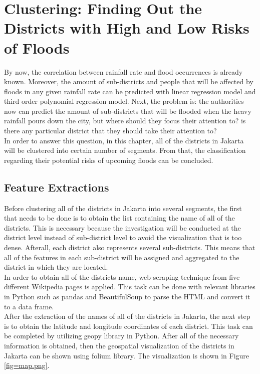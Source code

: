 \chapter{Clustering: Finding Out the Districts with High and Low Risks of Floods}

By now, the correlation between rainfall rate and flood occurrences is already known. Moreover, the amount of sub-districts and people that will be affected by floods in any given rainfall rate can be predicted with linear regression model and third order polynomial regression model. Next, the problem is: the authorities now can predict the amount of sub-districts that will be flooded when the heavy rainfall pours down the city, but where should they focus their attention to? is there any particular district that they should take their attention to?\\

\noindent
In order to answer this question, in this chapter, all of the districts in Jakarta will be clustered into certain number of segments. From that, the classification regarding their potential risks of upcoming floods can be concluded.\\

\section{Feature Extractions}
Before clustering all of the districts in Jakarta into several segments, the first that needs to be done is to obtain the list containing the name of all of the districts. This is necessary because the investigation will be conducted at the district level instead of sub-district level to avoid the visualization that is too dense. Afterall, each district also represents several sub-districts. This means that all of the features in each sub-district will be assigned and aggregated to the district in which they are located.\\

\noindent
In order to obtain all of the districts name, web-scraping technique from five different Wikipedia pages is applied. This task can be done with relevant libraries in Python such as pandas and BeautifulSoup to parse the HTML and convert it to a data frame.\\

\noindent
After the extraction of the names of all of the districts in Jakarta, the next step is to obtain the latitude and longitude coordinates of each district. This task can be completed by utilizing geopy library in Python. After all of the necessary information is obtained, then the geospatial visualization of the districts in Jakarta can be shown using folium library. The visualization is shown in Figure \ref{fig=map.png}.\\

